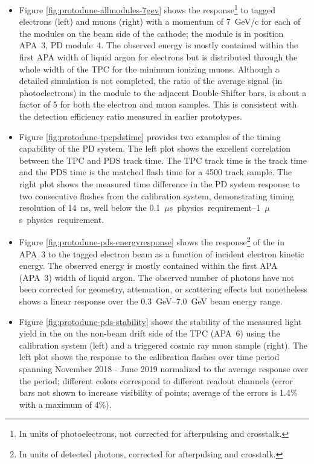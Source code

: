 \begin{itemize}
   \item Figure \ref{fig:protodune-allmodules-7gev} shows the response\footnote{In units of photoelectrons, not corrected for  afterpulsing and crosstalk.} to tagged electrons (left) and muons (right) with a momentum of \SI{7}{GeV/c} for each of the  modules on the beam side of the cathode; the  module is in position APA~3, PD module~4. The observed energy is mostly contained within the first APA width of liquid argon for electrons but is distributed through the whole width of the TPC for the minimum ionizing muons. Although a detailed simulation is not completed, the ratio of the average signal (in photoelectrons) in the  module to the adjacent Double-Shifter bars, is about a factor of 5 for both the electron and muon samples. This is consistent with the detection efficiency ratio measured in earlier prototypes.
   

    \item Figure \ref{fig:protodune-tpcpdstime} provides two examples of the timing capability of the PD system. The left plot shows the excellent correlation between the TPC and PDS track time. 
    The TPC track time is the track \tzero time and the PDS time is the matched flash time for a 4500 track sample. The right plot shows the measured time difference in the PD system response to two consecutive flashes from the calibration system, demonstrating timing resolution of \SI{14}{ns}, well below the \SIrange{0.1}{1}{$\mu$s} physics requirement.
 
    \item Figure \ref{fig:protodune-pds-energyresponse} shows the response\footnote{In units of detected photons, corrected for  afterpulsing and crosstalk.} of the  in APA~3 to the tagged electron beam as a function of incident electron kinetic energy. 
    The observed energy is mostly contained within the first APA (APA~3) width of liquid argon. The observed number of photons have not been corrected for geometry, attenuation, or scattering effects but nonetheless shows a linear response over the \SIrange{0.3}{7.0}{GeV} beam energy range.   
    
    \item Figure \ref{fig:protodune-pds-stability} shows the stability of the measured light yield in the  on the non-beam drift side of the TPC (APA~6) using the calibration system (left) and a triggered cosmic ray muon sample (right). The left plot shows the response to the calibration flashes over time period spanning November 2018 - June 2019 normalized to the average response over the period; different colors correspond to different readout channels (error bars not shown to increase visibility of points; average of the errors is 1.4\% with a maximum of 4\%). 
  

\end{itemize}
